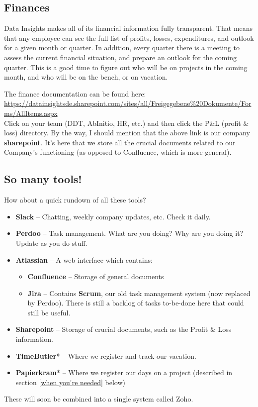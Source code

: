 \documentclass[11pt]{report}
\begin{document}
\subsection{Finances}
Data Insights makes all of its financial information fully transparent. That means that any employee can see the full list of profits, losses, expenditures, and outlook for a given month or quarter. In addition, every quarter there is a meeting to assess the current financial situation, and prepare an outlook for the coming quarter. This is a good time to figure out who will be on projects in the coming month, and who will be on the bench, or on vacation.

The finance documentation can be found here:\\
\href{https://datainsightsde.sharepoint.com/sites/all/Freigegebene\%20Dokumente/Forms/AllItems.aspx}{\scriptsize https://datainsightsde.sharepoint.com/sites/all/Freigegebene\%20Dokumente/Forms/AllItems.aspx}\\
Click on your team (DDT, AbInitio, HR, etc.) and then click the P\&L (profit \& loss) directory. By the way, I should mention that the above link is our company \textbf{sharepoint}. It's here that we store all the crucial documents related to our Company's functioning (as opposed to Confluence, which is more general).

\subsection{So many tools!}
How about a quick rundown of all these tools?
\begin{itemize}
\item \textbf{Slack} -- Chatting, weekly company updates, etc. Check it daily.
\item \textbf{Perdoo} -- Task management. What are you doing? Why are you doing it? Update as you do stuff.
\item \textbf{Atlassian} -- A web interface which contains:
\begin{itemize}
\item \textbf{Confluence} -- Storage of general documents
\item \textbf{Jira} -- Contains \textbf{Scrum}, our old task management system (now replaced by Perdoo). There is still a backlog of tasks to-be-done here that could still be useful.
\end{itemize}
\item \textbf{Sharepoint} -- Storage of crucial documents, such as the Profit \& Loss information.
\item \textbf{TimeButler}* -- Where we register and track our vacation.
\item \textbf{Papierkram}* -- Where we register our days on a project (described in section \ref{when you're needed} below)
\end{itemize}
{\scriptsize * These will soon be combined into a single system called Zoho.}
\end{document}
